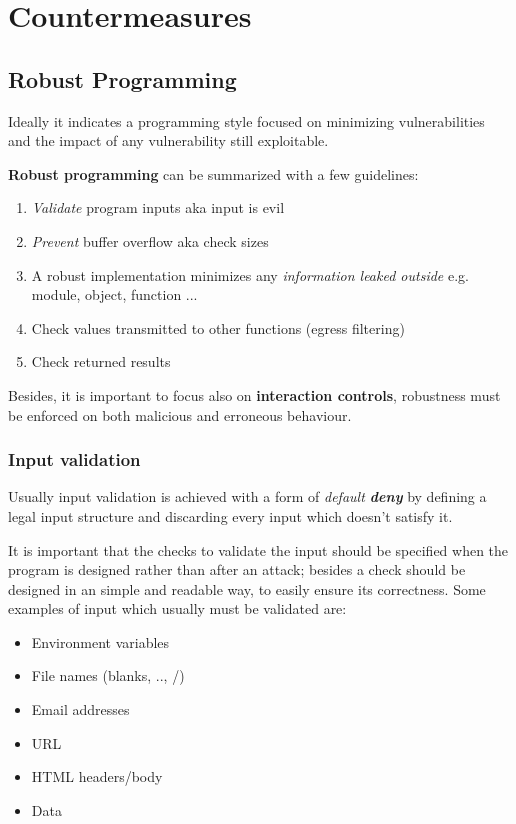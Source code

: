 \chapter{Countermeasures}
\section{Robust Programming}
Ideally it indicates a programming style focused on minimizing vulnerabilities and the impact of any vulnerability still exploitable.

\textbf{Robust programming} can be summarized with a few guidelines:
\begin{enumerate}
   \item \textit{Validate} program inputs aka input is evil
   \item \textit{Prevent} buffer overflow aka check sizes
   \item A robust implementation minimizes any \textit{information leaked outside} 
   e.g. module, object, function ...
   \item Check values transmitted to other functions (egress filtering)
   \item Check returned results
\end{enumerate}
Besides, it is important to focus also on \textbf{interaction controls},
robustness must be enforced on both malicious and erroneous behaviour.

\subsection{Input validation}
Usually input validation is achieved with a form of \textit{default \textbf{deny}} by defining a legal input structure and discarding every input which doesn't satisfy it.

It is important that the checks to validate the input should be specified when the program is designed rather than after an attack;
besides a check should be designed in an simple and readable way,
to easily ensure its correctness.
Some examples of input which usually must be validated are:
\begin{itemize}
   \item Environment variables
   \item File names (blanks, .., /)
   \item Email addresses
   \item URL
   \item HTML headers/body
   \item Data
\end{itemize} 

